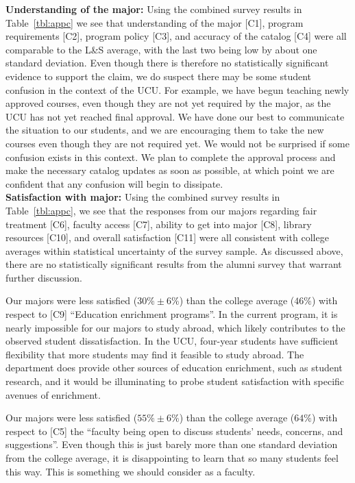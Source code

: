 \documentclass[12pt]{article}
\begin{document}
\noindent
{\bf Understanding of the major:} Using the combined survey results in
Table~\ref{tbl:appc} we see that understanding of the major [C1],
program requirements [C2], program policy [C3], and accuracy of the
catalog [C4] were all comparable to the L\&S average, with the last
two being low by about one standard deviation.  Even though there is
therefore no statistically significant evidence to support the claim,
we do suspect there may be some student confusion in the context of
the UCU.  For example, we have begun teaching newly approved courses,
even though they are not yet required by the major, as the UCU has not
yet reached final approval.  We have done our best to communicate the
situation to our students, and we are encouraging them to take the new
courses even though they are not required yet.  We would not be
surprised if some confusion exists in this context.  We plan to
complete the approval process and make the necessary catalog updates
as soon as possible, at which point we are confident that any
confusion will begin to dissipate.\\[3pt]

\noindent
{\bf Satisfaction with major:} Using the combined survey results in
Table~\ref{tbl:appc}, we see that the responses from our majors regarding
fair treatment [C6], faculty access [C7], ability to get into major
[C8], library resources [C10], and overall satisfaction [C11] were all
consistent with college averages within statistical uncertainty of the
survey sample.  As discussed above, there are no statistically
significant results from the alumni survey that warrant further discussion.

Our majors were less satisfied ($30\% \pm 6\%$) than the college
average ($46\%$) with respect to [C9] ``Education enrichment
programs''.  In the current program, it is nearly impossible for our
majors to study abroad, which likely contributes to the observed
student dissatisfaction.  In the UCU, four-year students have
sufficient flexibility that more students may find it feasible to
study abroad.  The department does provide other sources of education
enrichment, such as student research, and it would be illuminating to
probe student satisfaction with specific avenues of enrichment.

Our majors were less satisfied ($55\%\pm6\%$) than the college
average ($64\%$) with respect to [C5] the ``faculty being open to
discuss students' needs, concerns, and suggestions''.  Even though
this is just barely more than one standard deviation from the college
average, it is disappointing to learn that so many students feel this
way.  This is something we should consider as a faculty.\\[3pt]
\end{document}
